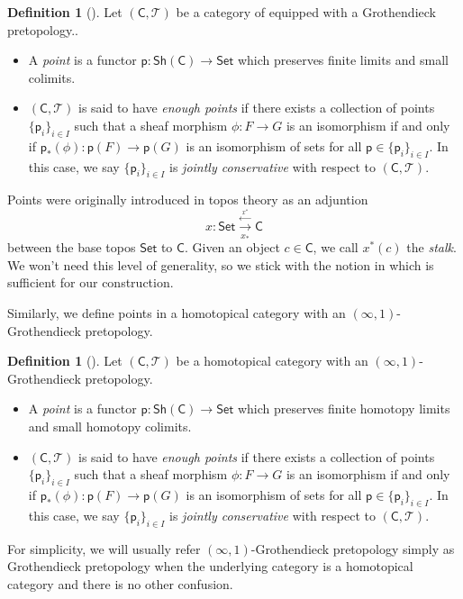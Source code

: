 \documentclass[12pt]{amsart}
\theoremstyle{definition}
\newtheorem{defn}[thm]{Definition}
\theoremstyle{remark}
\numberwithin{equation}{section}
\newcommand{\CC}{{\mathsf C}}
\newcommand{\1}{{\mathbb{1}}}
\newcommand{\p}{\mathsf{p}}
\newcommand{\set}{\mathsf{Set}}
\newcommand{\sh}{\mathsf{Sh}}
\newcommand{\io}{\operatorname{(\infty, 1)}}
\begin{document}
\begin{defn}[\cite{RZ20}]
	Let $(\CC, \mathcal{T})$ be a category of equipped with a Grothendieck pretopology.. 
	\begin{itemize}
		\item A {\it point} is a functor $\p: \sh (\CC) \to \set $ which preserves finite limits and small colimits.
		\item $(\CC, \mathcal{T})$ is said to have {\it enough points} if there exists a collection of points $\{\p_i\}_{i\in I}$ such that a sheaf morphism $\phi: F\to G$ is an isomorphism if and only if $\p_*(\phi): \p(F)\to \p(G)$ is an isomorphism of sets for all $\p\in \{\p_i\}_{i\in I}$. In this case, we say $\{\p_i\}_{i\in I}$ is {\it jointly conservative} with respect to $(\CC, \mathcal{T})$.
	\end{itemize}
\end{defn}
Points were originally introduced in topos theory as an adjuntion
$$
x : \set \stackrel{\overset{x^*}{\leftarrow}}{\underset{x_*}{\to}} \CC
$$
between the base topos $\set$ to $\CC$. Given an object $c\in \CC$, we call $x^*(c)$ the {\it stalk}. We won't need this level of generality, so we stick with the notion in \cite{RZ20} which is sufficient for our construction.


Similarly, we define points in  a homotopical category with an $\io$-Grothendieck pretopology.

\begin{defn}[\cite{RZ20}]
	Let $(\CC, \mathcal{T})$ be a homotopical category with an $\io$-Grothendieck pretopology.
	\begin{itemize}
		\item A {\it point} is a functor $\p: \sh (\CC) \to \set $ which preserves finite homotopy limits and small homotopy colimits.
		\item $(\CC, \mathcal{T})$ is said to have {\it enough points} if there exists a collection of points $\{\p_i\}_{i\in I}$ such that a sheaf morphism $\phi: F\to G$ is an isomorphism if and only if $\p_*(\phi): \p(F)\to \p(G)$ is an isomorphism of sets for all $\p\in \{\p_i\}_{i\in I}$. In this case, we say $\{\p_i\}_{i\in I}$ is {\it jointly conservative} with respect to $(\CC, \mathcal{T})$.
	\end{itemize}
\end{defn}
For simplicity, we will usually refer $\io$-Grothendieck pretopology simply as Grothendieck pretopology when the underlying category is a homotopical category and there is no other confusion.
\end{document}
